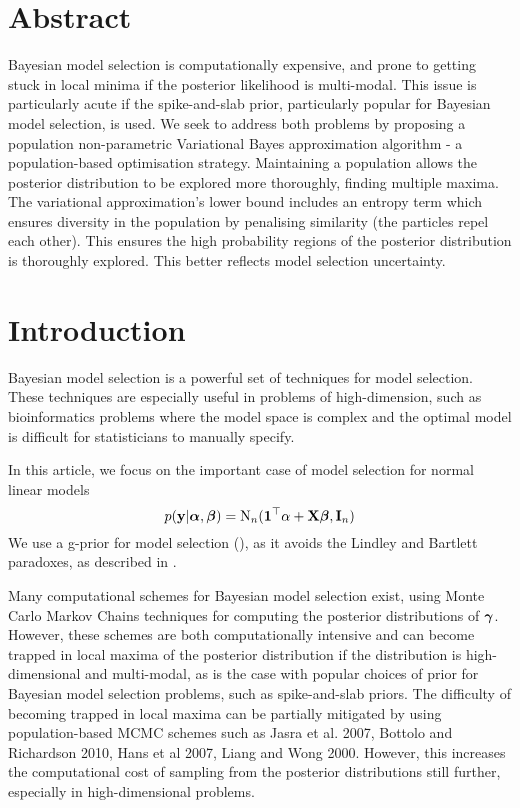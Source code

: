 \documentclass{amsart}[12pt]
\begin{document}
\section{Abstract}

Bayesian model selection is computationally expensive, and prone to getting stuck in local minima if the
posterior likelihood is multi-modal. This issue is particularly acute if the spike-and-slab prior,
particularly popular for Bayesian model selection, is used. We seek to address both problems by proposing a
population non-parametric Variational Bayes approximation algorithm - a population-based optimisation
strategy. Maintaining a population allows the posterior distribution to be explored more thoroughly, finding
multiple maxima. The variational approximation's lower bound includes an entropy term which ensures diversity
in the population by penalising similarity (the particles repel each other). This ensures the high probability
regions of the posterior distribution is thoroughly explored. This better reflects model selection
uncertainty.

\section{Introduction}

Bayesian model selection is a powerful set of techniques for model selection. These techniques are especially
useful in problems of high-dimension, such as bioinformatics problems where the model space is complex and
the optimal model is difficult for statisticians to manually specify.

In this article, we focus on the important case of model selection for normal linear models
\[
	p({\bf y} | {\boldsymbol \alpha}, {\boldsymbol \beta}) = \text{N}_n({\bf 1}^\top \alpha + {\bf X} {\boldsymbol \beta}, {\bf I}_n)
\]
We use a g-prior for model selection (\cite{Goel1986}), as it avoids the Lindley and Bartlett paradoxes, as 
described in \cite{Liang2008}.

Many computational schemes for Bayesian model selection exist, using Monte Carlo Markov Chains techniques for 
computing the posterior distributions of ${\boldsymbol \gamma}$.
However, these schemes are both computationally intensive and can become trapped in local maxima of
the posterior distribution if the distribution is high-dimensional and multi-modal, as is the case with
popular choices of prior for Bayesian model selection problems, such as spike-and-slab priors. The difficulty
of becoming trapped in local maxima can be partially mitigated by using population-based MCMC schemes such
as Jasra et al. 2007, Bottolo and Richardson 2010, Hans et al 2007, Liang and Wong 2000. However, this
increases the computational cost of sampling from the posterior distributions still further, especially in
high-dimensional problems.
\end{document}
